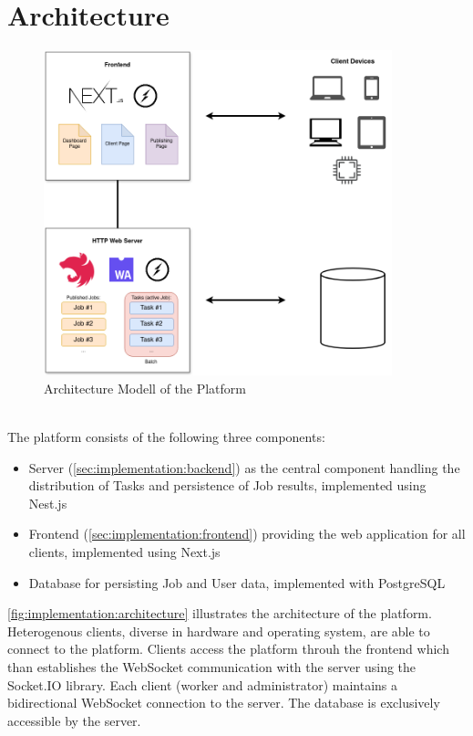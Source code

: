 \section{Architecture}
\label{sec:implementation:architecture}
\begin{figure}[htbp]
    \centering
    \includegraphics[width=0.9\textwidth]{gfx/figures/WebAssembly-MA.png}
    \caption{Architecture Modell of the Platform}
    \label{fig:implementation:architecture}
\end{figure}
~\\
The platform consists of the following three components:
\begin{itemize}
    \item Server (\autoref{sec:implementation:backend}) as the central component handling the distribution of Tasks and persistence of Job results, implemented using Nest.js \cite{methodology:nestjs}
    \item Frontend (\autoref{sec:implementation:frontend}) providing the web application for all clients, implemented using Next.js \cite{methodology:nextjs}
    \item Database for persisting Job and User data, implemented with PostgreSQL \cite{methodology:db}
\end{itemize}
\autoref{fig:implementation:architecture} illustrates the architecture of the platform. Heterogenous clients, diverse in hardware and operating system, are able to connect to the platform. Clients access the platform throuh the frontend which than establishes the WebSocket communication with the server using the Socket.IO \cite{methodology:websockets2} library. Each client (worker and administrator) maintains a bidirectional WebSocket connection to the server. The database is exclusively accessible by the server.

